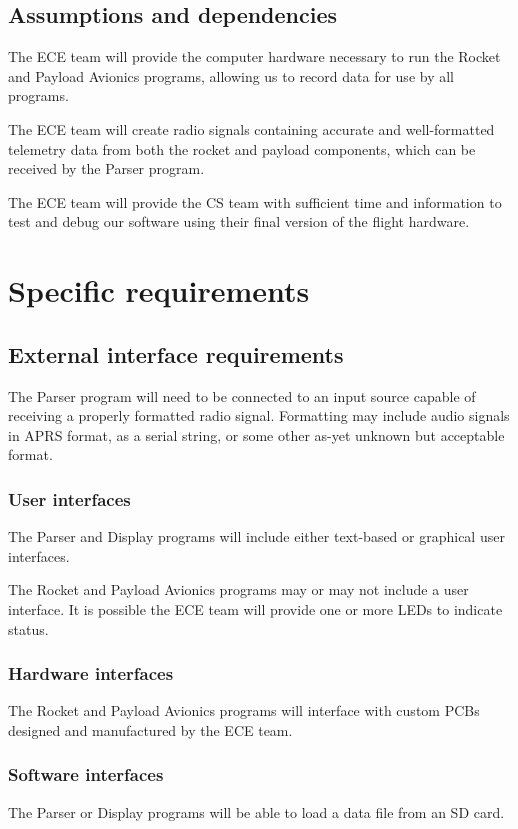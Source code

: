 \documentclass[onecolumn, draftclsnofoot, 10pt, compsoc]{IEEEtran}
\begin{document}
\subsection{Assumptions and dependencies}
The ECE team will provide the computer hardware necessary to run the Rocket and Payload Avionics programs, allowing us to record data for use by all programs.

The ECE team will create radio signals containing accurate and well-formatted telemetry data from both the rocket and payload components, which can be received by the Parser program.

The ECE team will provide the CS team with sufficient time and information to test and debug our software using their final version of the flight hardware.

\section{Specific requirements}
\subsection{External interface requirements}
The Parser program will need to be connected to an input source capable of receiving a properly formatted radio signal.  Formatting may include audio signals in APRS format, as a serial string, or some other as-yet unknown but acceptable format.

\subsubsection{User interfaces}
The Parser and Display programs will include either text-based or graphical user interfaces.

The Rocket and Payload Avionics programs may or may not include a user interface.  It is possible the ECE team will provide one or more LEDs to indicate status.

\subsubsection{Hardware interfaces}
The Rocket and Payload Avionics programs will interface with custom PCBs designed and manufactured by the ECE team.
	
\subsubsection{Software interfaces}
The Parser or Display programs will be able to load a data file from an SD card.
\end{document}
